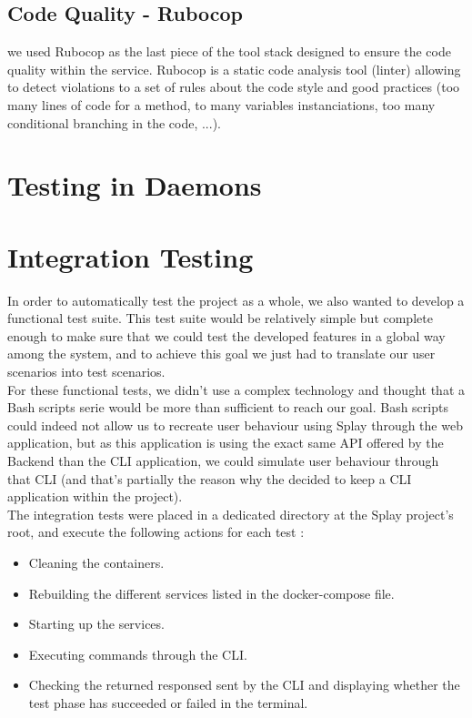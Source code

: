 \documentclass{eplmastersthesis}
\begin{document}
      \subsection{Code Quality - Rubocop}

        we used Rubocop as the last piece of the tool stack designed to ensure
        the code quality within the service. Rubocop is a static code analysis
        tool (linter) allowing to detect violations to a set of rules about
        the code style and good practices (too many lines of code for a method,
        to many variables instanciations, too many conditional branching
        in the code, ...).

    \section{Testing in Daemons}


    \section{Integration Testing}

      In order to automatically test the project as a whole, we also wanted to
      develop a functional test suite. This test suite would be relatively
      simple but complete enough to make sure that we could test the developed
      features in a global way among the system, and to achieve this goal we
      just had to translate our user scenarios into test scenarios.\\

      For these functional tests, we didn't use a complex technology and
      thought that a Bash scripts serie would be more than sufficient to
      reach our goal. Bash scripts could indeed not allow us to recreate user
      behaviour using Splay through the web application, but as this
      application is using the exact same API offered by the Backend than the
      CLI application, we could simulate user behaviour through that CLI (and
      that's partially the reason why the decided to keep a CLI application
      within the project).\\

      The integration tests were placed in a dedicated directory at the Splay
      project's root, and execute the following actions for each test :

      \begin{itemize}
        \item Cleaning the containers.
        \item Rebuilding the different services listed in the docker-compose file.
        \item Starting up the services.
        \item Executing commands through the CLI.
        \item Checking the returned responsed sent by the CLI and displaying
        whether the test phase has succeeded or failed in the terminal.
      \end{itemize}
\end{document}
